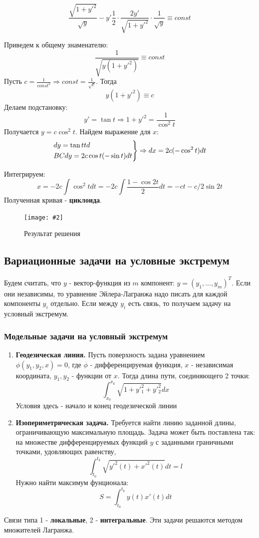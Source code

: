 \documentclass[a4paper, 14pt]{extarticle}
\newcommand{\screenshot}[3]{
	\begin{figure}[h]
		\centering
		\texttt{[image: \#2]}
		\caption{#3}
	\end{figure}
}
\numberwithin{equation}{section}
\begin{document}
    \[ \frac{\sqrt{1+y'^2}}{\sqrt{y}} - y' \frac{1}{2} \cdot \frac{2y'}{\sqrt{1+y'^2}} \cdot \frac{1}{\sqrt{y}} \equiv const \]
    
    Приведем к общему знаменателю:
    \[ \frac{1}{\sqrt{y(1+y'^2)}} \equiv const \]
    Пусть $c = \frac{1}{const^2} \Rightarrow const = \frac{1}{\sqrt{c}} $. Тогда 
    \[ y(1+y'^2) \equiv c \]
    Делаем подстановку: \[ y' = \tan{t} \Rightarrow 1 + y'^2 = \frac{1}{\cos^2 t}  \]
    Получается $y=c \cos^2{t}$. Найдем выражение для $x$:
    \[ \begin{rcases*}
        dy = \tan{t} td \\
        B
        C
        dy = 2c \cos t(-\sin{t})dt
\end{rcases*} \Rightarrow dx = 2c(-\cos^2 t) dt \]
    
    Интегрируем:
    \[ x = -2c \int \cos^2 t dt = -2c \int \frac{1-\cos 2t}{2} dt = -ct-c/2 \sin 2t \]
    Полученная кривая - \textbf{циклоида}. 
    \screenshot{width=6cm}{img/S007.jpg}{Результат решения}
	
    \subsection{Вариационные задачи на условные экстремум}
    Будем считать, что $y$ - вектор-функция из $m$ компонент: $y=(y_1, ..., y_m)^T$. Если они независимы, то уравнение Эйлера-Лагранжа надо писать для каждой компоненты $y_i$ отдельно. Если между $y_i$ есть связь, то получаем задачу на условный экстремум.

    \subsubsection{Модельные задачи на условный экстремум}
    \begin{enumerate}
        \item \textbf{Геодезическая линия.} Пусть поверхность задана уравнением $\phi(y_1,y_2,x)=0$, где $\phi$ - дифференцируемая функция, $x$ - независимая координата, $y_1, y_2$ - функции от $x$. Тогда длина пути, соединяющего 2 точки:
        \[ \int_{x_0}^{x_k} \sqrt{1 + y'^2_1 + y'^2_2} dx \]
        Условия здесь - начало и конец геодезической линии
        \item \textbf{Изопериметрическая задача.} Требуется найти линию заданной длины, ограничивающую максимальную площадь. Задача может быть поставлена так: на множестве дифференцируемых функций $y$ с заданными граничными точками, удовляющих равенству, 
        \[ \int_{t_0}^{t_k} \sqrt{y'^2(t) + x'^2(t)} dt = l \]
        Нужно найти максимум фунционала:
        \[ S = \int_{t_0}^{t_k} y(t)x'(t)dt \]
    \end{enumerate}
    Связи типа 1 - \textbf{локальные}, 2 - \textbf{интегральные}. Эти задачи решаются методом множителей Лагранжа.
\end{document}
